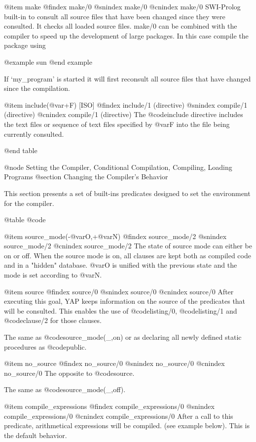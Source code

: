 {{{{@item make
@findex make/0
@snindex make/0
@cnindex make/0
    SWI-Prolog built-in to consult all source files that have been
    changed since they were consulted. It checks all loaded source
    files. make/0 can be combined with the compiler to speed up the
    development of large packages. In this case compile the package
    using

@example
    sun%
@end example

    If `my_program' is started it will first reconsult all source files
    that have changed since the compilation. 

@item include(@var{+F}) [ISO]
@findex include/1 (directive)
@snindex compile/1 (directive)
@cnindex compile/1 (directive)
The @code{include} directive includes the text files or sequence of text
files specified by @var{F} into the file being currently consulted.

@end table

@node Setting the Compiler, Conditional Compilation, Compiling, Loading Programs
@section Changing the Compiler's Behavior

This section presents a set of built-ins predicates designed to set the 
environment for the compiler.

@table @code

@item source_mode(-@var{O},+@var{N})
@findex source_mode/2
@snindex source_mode/2
@cnindex source_mode/2
The state of source mode can either be on or off. When the source mode
is on, all clauses are kept both as compiled code and in a "hidden"
database. @var{O} is unified with the previous state and the mode is set
according to @var{N}.

@item source
@findex source/0
@snindex source/0
@cnindex source/0
After executing this goal, YAP keeps information on the source
of the predicates that will be consulted. This enables the use of
@code{listing/0}, @code{listing/1} and @code{clause/2} for those
clauses.

The same as @code{source_mode(_,on)} or as declaring all newly defined
static procedures as @code{public}.

@item no_source
@findex no_source/0
@snindex no_source/0
@cnindex no_source/0
The opposite to @code{source}.

The same as @code{source_mode(_,off)}.

@item compile_expressions
@findex compile_expressions/0
@snindex compile_expressions/0
@cnindex compile_expressions/0
After a call to this predicate, arithmetical expressions will be compiled.
(see example below). This is the default behavior.

}}}}
